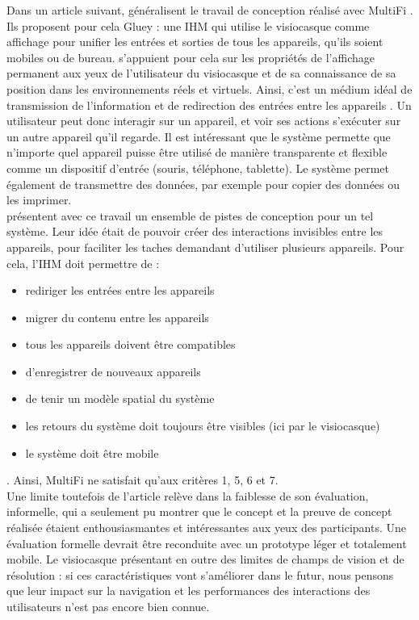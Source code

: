 Dans un article suivant, \cite{Serrano2015} généralisent le travail de conception réalisé avec MultiFi \citep{Grubert2015}. Ils proposent pour cela Gluey : une IHM qui utilise le visiocasque comme affichage pour unifier les entrées et sorties de tous les appareils, qu'ils soient mobiles ou de bureau. \citeauthor{Serrano2015} s'appuient pour cela sur les propriétés de l'affichage permanent aux yeux de l'utilisateur du visiocasque et de sa connaissance de sa position dans les environnements réels et virtuels. Ainsi, c'est un médium idéal de transmission de l'information et de redirection des entrées entre les appareils .
Un utilisateur peut donc interagir sur un appareil, et voir ses actions s'exécuter sur un autre appareil qu'il regarde. Il est intéressant que le système permette que n'importe quel appareil puisse être utilisé de manière transparente et flexible comme un dispositif d'entrée (souris, téléphone, tablette). Le système permet également de transmettre des données, par exemple pour copier des données ou les imprimer.\\
\citeauthor{Serrano2015} présentent avec ce travail un ensemble de pistes de conception pour un tel système. Leur idée était de pouvoir créer des interactions invisibles entre les appareils, pour faciliter les taches demandant d'utiliser plusieurs appareils. Pour cela, l'IHM doit permettre de : 
\begin{itemize}
  \item rediriger les entrées entre les appareils
  \item migrer du contenu entre les appareils
  \item tous les appareils doivent être compatibles
  \item d'enregistrer de nouveaux appareils
  \item de tenir un modèle spatial du système
  \item les retours du système doit toujours être visibles (ici par le visiocasque)
  \item le système doit être mobile
\end{itemize}. Ainsi, MultiFi \citep{Grubert2015} ne satisfait qu'aux critères 1, 5, 6 et 7.\\
Une limite toutefois de l'article relève dans la faiblesse de son évaluation, informelle, qui a seulement pu montrer que le concept et la preuve de concept réalisée étaient enthousiasmantes et intéressantes aux yeux des participants. Une évaluation formelle devrait être reconduite avec un prototype léger et totalement mobile. Le visiocasque présentant en outre des limites de champs de vision et de résolution : si ces caractéristiques vont s'améliorer dans le futur, nous pensons que leur impact sur la navigation et les performances des interactions des utilisateurs n'est pas encore bien connue.

